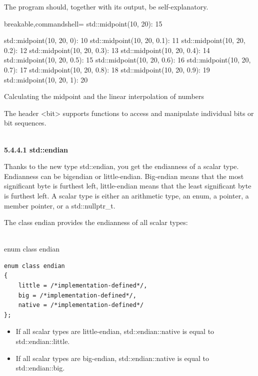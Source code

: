 The program should, together with its output, be self-explanatory.

\begin{tcblisting}{breakable,commandshell={}}
std::midpoint(10, 20): 15

std::midpoint(10, 20, 0): 10
std::midpoint(10, 20, 0.1): 11
std::midpoint(10, 20, 0.2): 12
std::midpoint(10, 20, 0.3): 13
std::midpoint(10, 20, 0.4): 14
std::midpoint(10, 20, 0.5): 15
std::midpoint(10, 20, 0.6): 16
std::midpoint(10, 20, 0.7): 17
std::midpoint(10, 20, 0.8): 18
std::midpoint(10, 20, 0.9): 19
std::midpoint(10, 20, 1): 20
\end{tcblisting}

\begin{center}
Calculating the midpoint and the linear interpolation of numbers
\end{center}


The header <bit> supports functions to access and manipulate individual bits or bit sequences.

\hspace*{\fill} \\ %
\noindent
\textbf{5.4.4.1\hspace{0.2cm} std::endian}

Thanks to the new type std::endian, you get the endianness of a scalar type. Endianness can be bigendian or little-endian. Big-endian means that the most significant byte is furthest left, little-endian means that the least significant byte is furthest left. A scalar type is either an arithmetic type, an enum, a pointer, a member pointer, or a std::nullptr\_t.

The class endian provides the endianness of all scalar types:

\hspace*{\fill} \\ %
\noindent
enum class endian
\begin{lstlisting}[style=styleCXX]
enum class endian
{
	little = /*implementation-defined*/,
	big = /*implementation-defined*/,
	native = /*implementation-defined*/
};
\end{lstlisting}

\begin{itemize}
\item 
If all scalar types are little-endian, std::endian::native is equal to std::endian::little.

\item 
If all scalar types are big-endian, std::endian::native is equal to std::endian::big.
\end{itemize}

